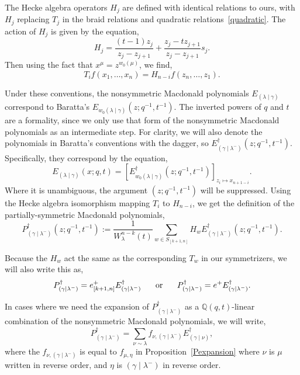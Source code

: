 \documentclass[ALCO]{cedram}
\newcommand{\ep}{e^+}
\newcommand{\eplusB}{e^+_{[k+1,n]}}
\newcommand{\EB}[1]{E_{#1}^\dagger}
\newcommand{\EBlong}[1]{E_{#1}^\dagger(z;q^{-1},t^{-1})}
\newcommand{\EI}[1]{E_{#1}}
\newcommand{\EIlong}[1]{E_{#1}(x;q,t)}
\newcommand{\PB}[1]{P_{#1}^\dagger}
\newcommand{\PBlong}[1]{P_{#1}^\dagger(z;q^{-1},t^{-1})}
\newcommand{\nudom}{{( \lambda \mid \gamma )}}
\newcommand{\lambdagamma}{{\nudom}}
\newcommand{\gammalambdamin}{{(\gamma \mid \lambda^-)}}
\newcommand{\gammanu}{{(\gamma \mid \nu)}}
\newcommand{\fnu}{f_{\nu, \gammalambdamin}}
\begin{document}
The Hecke algebra operators $H_j$ are defined with identical relations to ours, with $H_j$ replacing $T_j$ in the braid relations and quadratic relations~\eqref{quadratic}. The action of $H_j$ is given by the equation,
\[ H_j = \frac{(t-1)z_j}{z_j-z_{j+1}} + \frac{z_j-tz_{j+1}}{z_j-z_{j+1}} s_j. \label{DLbaratta}\]
Then using the fact that $x^\mu = z^{w_0(\mu)}$, we find,
\[ T_i f(x_1, \dotsc, x_n) = H_{n-i}f(z_n, \dotsc, z_1).\]


Under these conventions, the nonsymmetric Macdonald polynomials $\EI{\lambdagamma}$ correspond to Baratta's $E_{w_0 \lambdagamma}(z;q^{-1},t^{-1})$. The inverted powers of $q$ and $t$ are a formality, since we only use that form of the nonsymmetric Macdonald polynomials as an intermediate step. For clarity, we will also denote the polynomials in Baratta's conventions with the dagger, so $\EBlong{\gammalambdamin}$. Specifically, they correspond by the equation,
\[ \EIlong{\lambdagamma}=\left[\EBlong{w_0\lambdagamma}\right]_{z_i \mapsto x_{n+1-i}}. \]
Where it is unambiguous, the argument $(z;q^{-1},t^{-1})$ will be suppressed. Using the Hecke algebra isomorphism mapping $T_i$ to $H_{n-i}$, we get the definition of the partially-symmetric Macdonald polynomials,
\[\PBlong{\gammalambdamin} := \frac{1}{W^{n-k}_{\lambda}(t)} \sum_{w\in S_{[k+1, n]}} H_w \EBlong{\gammalambdamin}.\]

Because the $H_w$ act the same as the corresponding $T_w$ in our symmetrizers, we will also write this as,
\[ \PB{\gammalambdamin} = \eplusB  \EB{\gammalambdamin} \hspace*{.5cm} \text{ or } \hspace*{.5cm} \PB{\gammalambdamin} = \ep \EB{\gammalambdamin}. \]

In cases where we need the expansion of $\PB{\gammalambdamin}$ as a $\mathbb{Q}(q,t)$-linear combination of the nonsymmetric Macdonald polynomials, we will write,
\[ \PB{\gammalambdamin}=\sum_{\nu \sim \lambda} \fnu \EB{\gammanu},\]
where the $\fnu$ is equal to $f_{\mu, \eta}$ in Proposition~\ref{Pexpansion} where $\nu$ is $\mu$ written in reverse order, and $\eta$ is $\gammalambdamin$ in reverse order.
\end{document}

